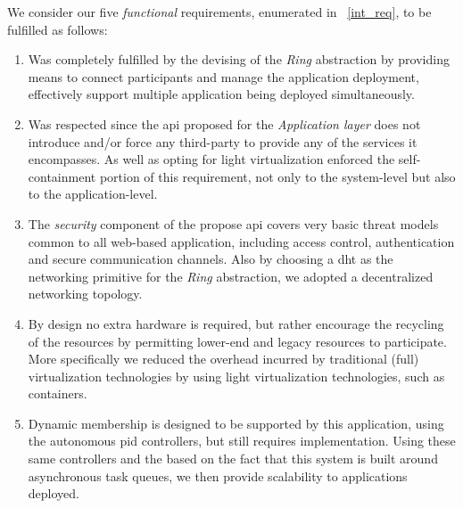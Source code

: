 \documentclass[12pt, titlepage]{uo_temp}
\begin{document}
     We consider our five \emph{functional} requirements, enumerated in ~\ref{int_req}, to
     be fulfilled as follows:
     \begin{enumerate}[label={\bf Requirement \arabic*}, 
                       wide=\parindent,
                       leftmargin=\parindent, 
                       rightmargin=\parindent]
     \item Was completely fulfilled by the devising of the \emph{Ring} abstraction by
       providing means to connect participants and manage the application deployment,
       effectively support multiple application being deployed simultaneously.
     \item Was respected since the \gls{api} proposed for the \emph{Application layer}
       does not introduce and/or force any third-party to provide any of the services it
       encompasses. As well as opting for light virtualization enforced the
       self-containment portion of this requirement, not only to the system-level but also
       to the application-level.
     \item The \emph{security} component of the propose \gls{api} covers very basic threat
       models common to all web-based application, including access control,
       authentication and secure communication channels. Also by choosing a \gls{dht} as
       the networking primitive for the \emph{Ring} abstraction, we adopted a
       decentralized networking topology.
     \item By design no extra hardware is required, but rather encourage the recycling of
       the resources by permitting lower-end and legacy resources to participate. More
       specifically we reduced the overhead incurred by traditional (full) virtualization
       technologies by using light virtualization technologies, such as containers.
     \item Dynamic membership is designed to be supported by this application, using the autonomous
       \gls{pid} controllers, but still requires implementation. Using these same
       controllers and the based on the fact that this system is built around asynchronous
       task queues, we then provide scalability to applications deployed.
     \end{enumerate}
\end{document}
